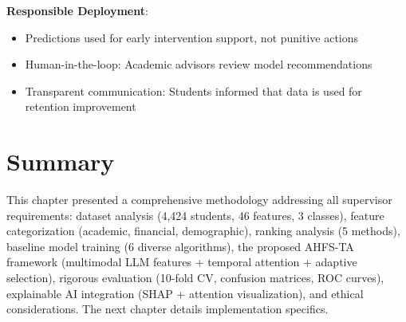 \textbf{Responsible Deployment}:
\begin{itemize}
\item Predictions used for early intervention support, not punitive actions
\item Human-in-the-loop: Academic advisors review model recommendations
\item Transparent communication: Students informed that data is used for retention improvement
\end{itemize}

\section{Summary}

This chapter presented a comprehensive methodology addressing all supervisor requirements: dataset analysis (4,424 students, 46 features, 3 classes), feature categorization (academic, financial, demographic), ranking analysis (5 methods), baseline model training (6 diverse algorithms), the proposed AHFS-TA framework (multimodal LLM features + temporal attention + adaptive selection), rigorous evaluation (10-fold CV, confusion matrices, ROC curves), explainable AI integration (SHAP + attention visualization), and ethical considerations. The next chapter details implementation specifics.
